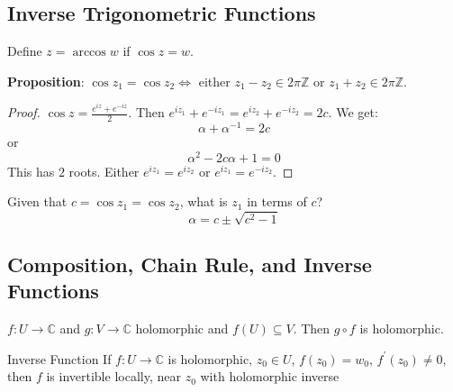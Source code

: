 \documentclass{report}
\begin{document}
\begin{topic}
    \section{Inverse Trigonometric Functions}
\end{topic}

Define $z = \arccos{w}$ if $\cos{z} = w$.

\textbf{Proposition}: $\cos{z_{1}} = \cos{z_{2}} \iff$ either $z_{1} - z_{2} \in 2\pi\mathbb{Z}$ or $z_{1} + z_{2} \in 2\pi \mathbb{Z}$.
    \begin{proof}
        $\cos{z} = \frac{e^{iz} + e^{-iz}}{2}$. Then $e^{iz_{1}} + e^{-iz_{1}} = e^{iz_{2}} + e^{-iz_{2}} = 2c$. We get:
            \begin{equation*}
                \alpha + \alpha^{-1}  = 2c
            \end{equation*}
        or 
            \begin{equation*}
                \alpha^{2} - 2c\alpha + 1 = 0 
            \end{equation*}
        This has $2$ roots. Either $e^{iz_{1}} = e^{iz_{2}}$ or $e^{iz_{1}} = e^{-iz_{2}}$.
    \end{proof}

Given that $c = \cos{z_{1}} = \cos{z_{2}}$, what is $z_{1}$ in terms of $c$?
    \begin{equation*}
        \alpha = c \pm \sqrt{c^{2} - 1}
    \end{equation*}

\begin{topic}
    \section{Composition, Chain Rule, and Inverse Functions}
\end{topic}

\begin{theorem}{}
    $f : U \rightarrow \mathbb{C}$ and $g : V \rightarrow \mathbb{C}$ holomorphic and $f(U) \subseteq V$. Then $g \circ f$ is holomorphic.
\end{theorem} 

\begin{theorem}{Inverse Function}
    If $f : U \rightarrow \mathbb{C}$ is holomorphic, $z_{0} \in U$, $f(z_{0}) = w_{0}$, $f^{\prime}(z_{0}) \neq 0$, then $f$ is invertible locally, near $z_{0}$ with holomorphic inverse
\end{theorem}
\end{document}
